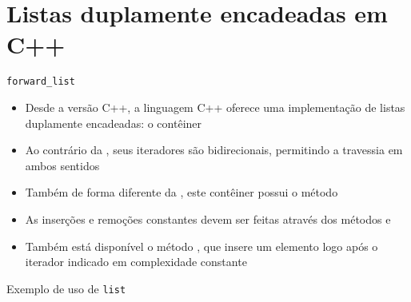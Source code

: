 \section{Listas duplamente encadeadas em C++}

\begin{frame}[fragile]{\texttt{forward\_list}}

    \begin{itemize}
        \item Desde a versão C++, a linguagem C++ oferece uma implementação de listas
            duplamente encadeadas: o contêiner 

        \item Ao contrário da , seus iteradores são bidirecionais,
            permitindo a travessia em ambos sentidos

        \item Também de forma diferente da , este contêiner possui o
            método 

        \item As inserções e remoções constantes devem ser feitas através dos métodos
             e 

        \item Também está disponível o método , que insere um elemento
            logo após o iterador indicado em complexidade constante
    \end{itemize}

\end{frame}

\begin{frame}[fragile]{Exemplo de uso de \texttt{list}}
\end{frame}
